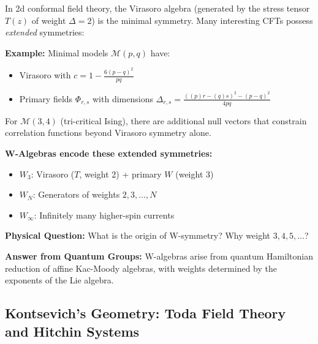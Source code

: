 \begin{motivation}
In 2d conformal field theory, the Virasoro algebra (generated by the stress tensor $T(z)$ of weight $\Delta = 2$) is the minimal symmetry. Many interesting CFTs possess \emph{extended} symmetries:

\textbf{Example:} Minimal models $\mathcal{M}(p,q)$ have:
\begin{itemize}
\item Virasoro with $c = 1 - \frac{6(p-q)^2}{pq}$
\item Primary fields $\Phi_{r,s}$ with dimensions $\Delta_{r,s} = \frac{((p)r - (q)s)^2 - (p-q)^2}{4pq}$
\end{itemize}

For $\mathcal{M}(3,4)$ (tri-critical Ising), there are additional null vectors that constrain correlation functions beyond Virasoro symmetry alone.

\textbf{W-Algebras encode these extended symmetries:}
\begin{itemize}
\item $W_3$: Virasoro ($T$, weight 2) + primary $W$ (weight 3)
\item $W_N$: Generators of weights $2, 3, \ldots, N$
\item $W_\infty$: Infinitely many higher-spin currents
\end{itemize}

\textbf{Physical Question:} What is the origin of W-symmetry? Why weight $3, 4, 5, \ldots$?

\textbf{Answer from Quantum Groups:} W-algebras arise from quantum Hamiltonian reduction of affine Kac-Moody algebras, with weights determined by the exponents of the Lie algebra.
\end{motivation}

\subsection{Kontsevich's Geometry: Toda Field Theory and Hitchin Systems}

